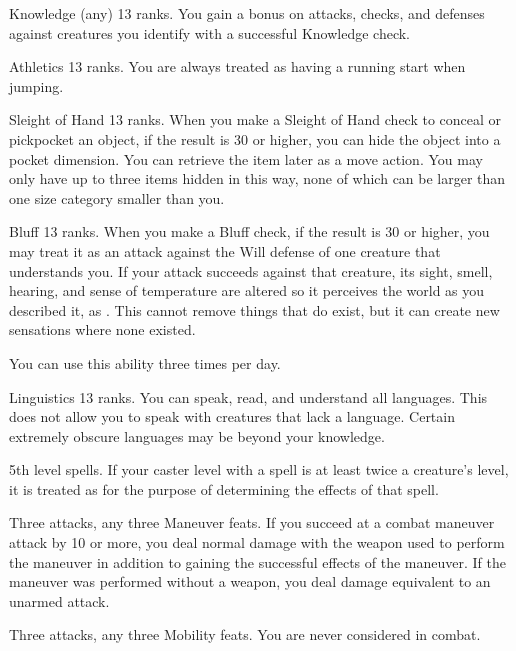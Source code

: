\featpre Knowledge (any) 13 ranks.
\featben You gain a  bonus on attacks, checks, and defenses against creatures you identify with a successful Knowledge check.

\featpre Athletics 13 ranks.
\featben You are always treated as having a running start when jumping.

\featpre Sleight of Hand 13 ranks.
\featben When you make a Sleight of Hand check to conceal or pickpocket an object, if the result is 30 or higher, you can hide the object into a pocket dimension.
You can retrieve the item later as a move action.
You may only have up to three items hidden in this way, none of which can be larger than one size category smaller than you.

\featpre Bluff 13 ranks.
\featben When you make a Bluff check, if the result is 30 or higher, you may treat it as an attack against the Will defense of one creature that understands you.
If your attack succeeds against that creature, its sight, smell, hearing, and sense of temperature are altered so it perceives the world as you described it, as .
This cannot remove things that do exist, but it can create new sensations where none existed.

You can use this ability three times per day.

\featpre Linguistics 13 ranks.
\featben You can speak, read, and understand all languages.
This does not allow you to speak with creatures that lack a language.
Certain extremely obscure languages may be beyond your knowledge.

\featpre 5th level spells.
\featben If your caster level with a spell is at least twice a creature's level, it is treated as \bloodied for the purpose of determining the effects of that spell.

\featpre Three attacks, any three Maneuver feats.
\featben If you succeed at a combat maneuver attack by 10 or more, you deal normal damage with the weapon used to perform the maneuver in addition to gaining the successful effects of the maneuver.
If the maneuver was performed without a weapon, you deal damage equivalent to an unarmed attack.

\featpre Three attacks, any three Mobility feats.
\featben You are never considered \engaged in combat.


